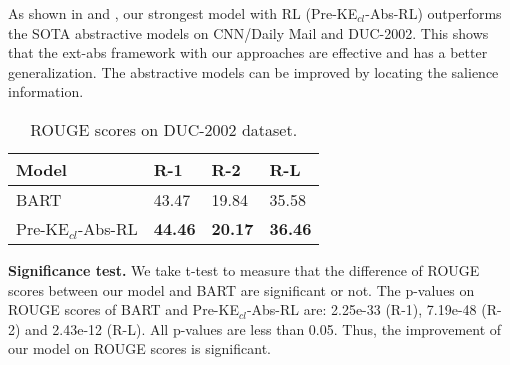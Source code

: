 As shown in  and ,
our strongest model with RL (Pre-KE$_{cl}$-Abs-RL) outperforms
the SOTA abstractive models on CNN/Daily Mail
and DUC-2002.
This shows
that the ext-abs framework with our approaches are effective
and has a better generalization.
The abstractive models can be improved by locating the salience information.

\begin{table}[th!]
\scriptsize
\begin{center}
\begin{tabular}{|l|l|l|l|}%
\hline
\bf Model & R-1 & R-2 & R-L \\
\hline 
BART & 43.47 & 19.84 & 35.58 \\
Pre-KE$_{cl}$-Abs-RL & \bf 44.46 & \bf 20.17 & \bf 36.46 \\
\hline
\end{tabular}
\caption{\label{tab:duc} ROUGE scores on DUC-2002 dataset.}
\end{center}
\end{table}


\textbf{Significance test.} 
We take t-test 
\citep{albert2017exploring} to
measure that the difference of ROUGE scores between our model 
and BART are significant or not. 
The p-values on ROUGE scores of BART and Pre-KE$_{cl}$-Abs-RL are:
2.25e-33 (R-1), 7.19e-48 (R-2) and 2.43e-12 (R-L).
All p-values are less than 0.05.
Thus, the improvement of our model on ROUGE scores is 
significant.%

